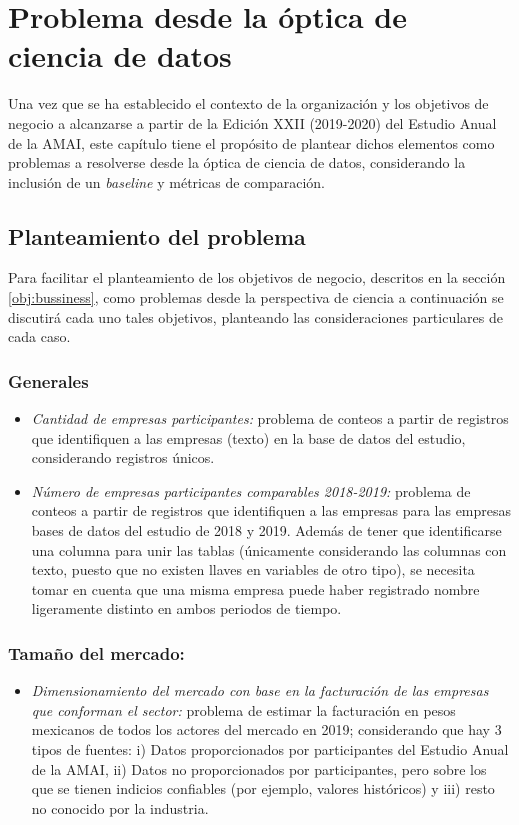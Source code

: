 \chapter{Problema desde la óptica de ciencia de datos}

\noindent Una vez que se ha establecido el contexto de la organización y los objetivos de negocio a alcanzarse a partir de la Edición XXII  (2019-2020)  del Estudio Anual de la AMAI, este capítulo tiene el propósito de plantear dichos elementos como problemas a resolverse desde la óptica de ciencia de datos, considerando la inclusión de un \emph{baseline} y métricas de comparación.

\section{Planteamiento del problema} \label{obj:datascience}

Para facilitar el planteamiento de los objetivos de negocio, descritos en la sección \ref{obj:bussiness}, como problemas desde la perspectiva de ciencia a continuación se discutirá cada uno tales objetivos, planteando las consideraciones particulares de cada caso.

\subsection{Generales}\label{problema:generales}

\begin{itemize}
\item \textit{Cantidad de empresas participantes:} problema de conteos a partir de registros que identifiquen a las empresas (texto) en la base de datos del estudio, considerando registros únicos.
\item \textit{Número de empresas participantes comparables 2018-2019:} problema de conteos a partir de registros que identifiquen a las empresas para las empresas bases de datos del estudio de 2018 y 2019. Además de tener que identificarse una columna para unir las tablas (únicamente considerando las columnas con texto, puesto que no existen llaves en variables de otro tipo), se necesita tomar en cuenta que una misma empresa puede haber registrado nombre ligeramente distinto en ambos periodos de tiempo. 
\end{itemize}

\subsection{Tamaño del mercado:}
\begin{itemize}
\item \textit{Dimensionamiento del mercado con base en la facturación de las empresas que conforman el sector:} problema de estimar la facturación en pesos mexicanos de todos los actores del mercado en 2019; considerando que hay 3 tipos de fuentes: i) Datos proporcionados por participantes del Estudio Anual de la AMAI, ii) Datos no proporcionados por participantes, pero sobre los que se tienen indicios confiables (por ejemplo, valores históricos) y iii) resto no conocido por la industria.
\end{itemize}

